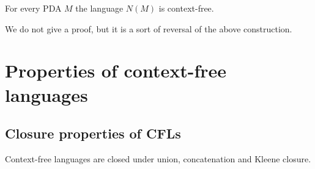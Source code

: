 \begin{page}
\setcounter{section}{6}
\setcounter{subsection}{4}
\setcounter{dfn}{11}
\label{portion:1284}

\begin{thm}
For every PDA $M$ the language $N(M)$ is context-free.
\end{thm}

\end{page}

\begin{page}
\setcounter{section}{7}
\setcounter{subsection}{0}
\setcounter{dfn}{11}
\label{portion:1285}

We do not give a proof, but it is a sort of reversal of the above construction.






\end{page}

\begin{page}
\setcounter{section}{7}
\setcounter{subsection}{1}
\setcounter{dfn}{0}
\label{portion:1287}

\section{Properties of context-free languages}

\end{page}

\begin{page}
\setcounter{section}{7}
\setcounter{subsection}{1}
\setcounter{dfn}{0}
\label{portion:1289}

\subsection{Closure properties of CFLs}

\end{page}

\begin{page}
\setcounter{section}{7}
\setcounter{subsection}{1}
\setcounter{dfn}{1}
\label{portion:1291}

\begin{thm}
\label{thm:CFLClosed}
Context-free languages are closed under union, concatenation and Kleene closure.
\end{thm}

\end{page}

